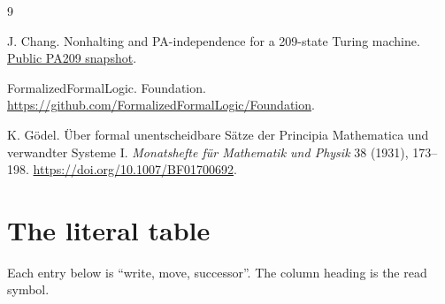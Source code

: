 \documentclass[11pt,letterpaper]{article}
\begin{document}
\begin{thebibliography}{9}

J. Chang.
Nonhalting and PA-independence for a 209-state Turing machine.
\href{https://github.com/jamesyc/BusyBeaver/tree/69d98241a721ead20b4f0b17df9062950b40fbfe}{Public PA209 snapshot}.

FormalizedFormalLogic.
Foundation.
\url{https://github.com/FormalizedFormalLogic/Foundation}.

K. G\"odel.
\"Uber formal unentscheidbare S\"atze der Principia Mathematica und
verwandter Systeme I.
\emph{Monatshefte f\"ur Mathematik und Physik} 38 (1931), 173--198.
\url{https://doi.org/10.1007/BF01700692}.

\end{thebibliography}

\appendix
\section{The literal table}\label{app:table}

Each entry below is ``write, move, successor''. The column heading is the
read symbol.


\end{document}
